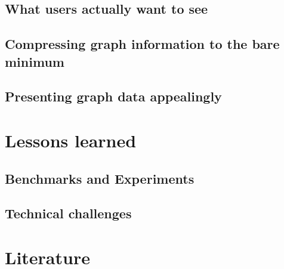 \documentclass[
        a4paper,     %
        titlepage,   %
        twoside,     %
        parskip      %
        ]{scrartcl}  %
\begin{document}
    \subsection{What users actually want to see}
    \subsection{Compressing graph information to the bare minimum}
    \subsection{Presenting graph data appealingly}
  \section{Lessons learned}
    \subsection{Benchmarks and Experiments}
    \subsection{Technical challenges}

  \section{Literature}

  \clearpage
  
\end{document}

